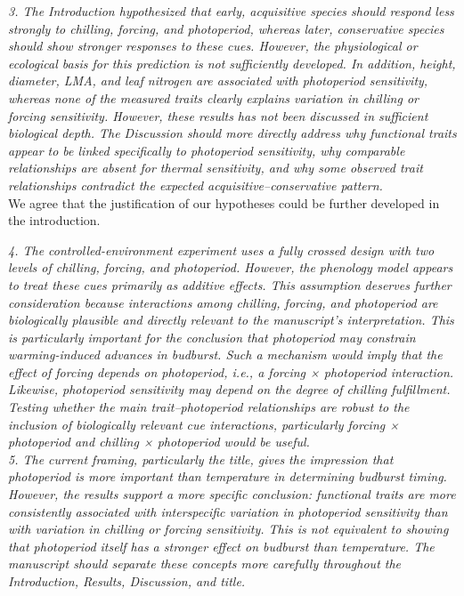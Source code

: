 \documentclass[11pt,a4paper]{article}
\begin{document}
\emph{3. The Introduction hypothesized that early, acquisitive species should respond less strongly to chilling, forcing, and photoperiod, whereas later, conservative species should show stronger responses to these cues. However, the physiological or ecological basis for this prediction is not sufficiently developed. In addition, height, diameter, LMA, and leaf nitrogen are associated with photoperiod sensitivity, whereas none of the measured traits clearly explains variation in chilling or forcing sensitivity. However, these results has not been discussed in sufficient biological depth. The Discussion should more directly address why functional traits appear to be linked specifically to photoperiod sensitivity, why comparable relationships are absent for thermal sensitivity, and why some observed trait relationships contradict the expected acquisitive–conservative pattern.}\\

We agree that the justification of our hypotheses could be further developed in the introduction.


\emph{4. The controlled-environment experiment uses a fully crossed design with two levels of chilling, forcing, and photoperiod. However, the phenology model appears to treat these cues primarily as additive effects. This assumption deserves further consideration because interactions among chilling, forcing, and photoperiod are biologically plausible and directly relevant to the manuscript’s interpretation. This is particularly important for the conclusion that photoperiod may constrain warming-induced advances in budburst. Such a mechanism would imply that the effect of forcing depends on photoperiod, i.e., a forcing × photoperiod interaction. Likewise, photoperiod sensitivity may depend on the degree of chilling fulfillment. Testing whether the main trait–photoperiod relationships are robust to the inclusion of biologically relevant cue interactions, particularly forcing × photoperiod and chilling × photoperiod would be useful.}\\

\emph{5. The current framing, particularly the title, gives the impression that photoperiod is more important than temperature in determining budburst timing. However, the results support a more specific conclusion: functional traits are more consistently associated with interspecific variation in photoperiod sensitivity than with variation in chilling or forcing sensitivity. This is not equivalent to showing that photoperiod itself has a stronger effect on budburst than temperature. The manuscript should separate these concepts more carefully throughout the Introduction, Results, Discussion, and title.}\\
\end{document}
